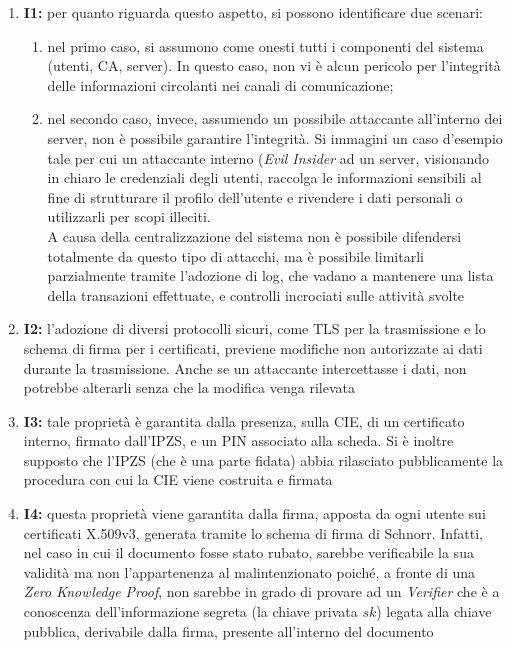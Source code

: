         \begin{enumerate}
            \item \textbf{I1:} per quanto riguarda questo aspetto, si possono identificare due scenari:
                \begin{enumerate}
                    \item nel primo caso, si assumono come onesti tutti i componenti del sistema (utenti, CA, server).
                    In questo caso, non vi è alcun pericolo per l'integrità delle informazioni circolanti nei canali di comunicazione;

                    \item nel secondo caso, invece, assumendo un possibile attaccante all'interno dei server, non è possibile garantire l'integrità.
                    Si immagini un caso d'esempio tale per cui un attaccante interno (\textit{Evil Insider} ad un server, visionando in chiaro le credenziali degli utenti, raccolga le informazioni sensibili al fine di strutturare il profilo dell'utente e rivendere i dati personali o utilizzarli per scopi illeciti. \\
                    A causa della centralizzazione del sistema non è possibile difendersi totalmente da questo tipo di attacchi, ma è possibile limitarli parzialmente tramite l'adozione di log, che vadano a mantenere una lista della transazioni effettuate, e controlli incrociati sulle attività svolte
                \end{enumerate}
            
            \item \textbf{I2:} l'adozione di diversi protocolli sicuri, come TLS per la trasmissione e lo schema di firma per i certificati, previene modifiche non autorizzate ai dati durante la trasmissione.
            Anche se un attaccante intercettasse i dati, non potrebbe alterarli senza che la modifica venga rilevata

            \item \textbf{I3:} tale proprietà è garantita dalla presenza, sulla CIE, di un certificato interno, firmato dall'IPZS, e un PIN associato alla scheda.
            Si è inoltre supposto che l'IPZS (che è una parte fidata) abbia rilasciato pubblicamente la procedura con cui la CIE viene costruita e firmata

            \item \textbf{I4:} questa proprietà viene garantita dalla firma, apposta da ogni utente sui certificati X.509v3, generata tramite lo schema di firma di Schnorr.
            Infatti, nel caso in cui il documento fosse stato rubato, sarebbe verificabile la sua validità ma non l'appartenenza al malintenzionato poiché, a fronte di una \textit{Zero Knowledge Proof}, non sarebbe in grado di provare ad un \textit{Verifier} che è a conoscenza dell’informazione segreta (la chiave privata $sk$) legata alla chiave pubblica, derivabile dalla firma, presente all’interno del documento
        \end{enumerate}

